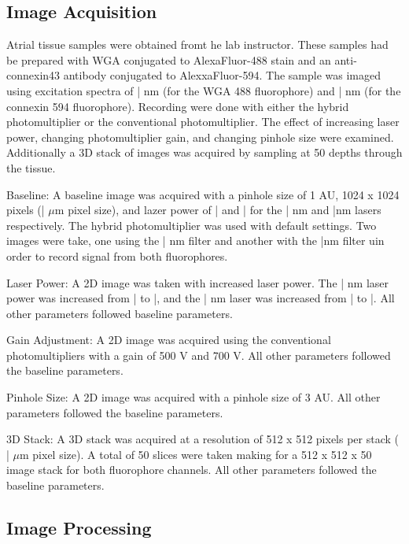 \documentclass[12pt]{article}
\newcommand{\micro}{{$\mu$}}
\begin{document}
\subsection{Image Acquisition}
Atrial tissue samples were obtained fromt he lab instructor. These samples had be prepared with WGA conjugated to AlexaFluor-488 stain and an anti-connexin43 antibody conjugated to AlexxaFluor-594. The sample was imaged using excitation spectra of | nm (for the WGA 488 fluorophore) and | nm (for the connexin 594 fluorophore). Recording were done with either the hybrid photomultiplier or the conventional photomultiplier. The effect of increasing laser power, changing photomultiplier gain, and changing pinhole size were examined. Additionally a 3D stack of images was acquired by sampling at 50 depths through the tissue.
\par{Baseline:} A baseline image was acquired with a pinhole size of 1 AU, 1024 x 1024 pixels (| \micro m pixel size), and lazer power of | and | for the | nm and |nm lasers respectively. The hybrid photomultiplier was used with default settings. Two images were take, one using the | nm filter and another with the |nm filter uin order to record signal from both fluorophores.
\par{Laser Power:} A 2D image was taken with increased laser power. The | nm laser power was increased from | to |, and the | nm laser was increased from | to |. All other parameters followed baseline parameters.
\par{Gain Adjustment:} A 2D image was acquired using the conventional photomultipliers with a gain of 500 V and 700 V. All other parameters followed the baseline parameters.
\par{Pinhole Size:} A 2D image was acquired with a pinhole size of 3 AU. All other parameters followed the baseline parameters.
\par{3D Stack: } A 3D stack was acquired at a resolution of 512 x 512 pixels per stack ( | \micro m pixel size). A total of 50 slices were taken making for a 512 x 512 x 50 image stack for both fluorophore channels. All other parameters followed the baseline parameters.

\subsection{Image Processing}




\end{document}
